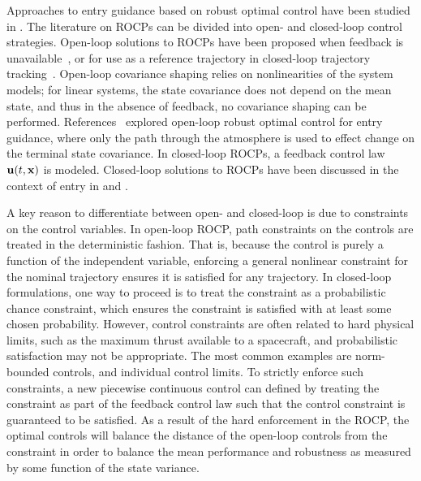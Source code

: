 Approaches to entry guidance based on robust optimal control have been studied in \cite{AltitudeUnderUncertainty, EntryOUUThesis1, EntryOUUThesis2, MarsEntryDesensitized, EntryOUU}. 
The literature on ROCPs can be divided into open- and closed-loop control strategies. Open-loop solutions to ROCPs have been proposed when feedback is unavailable~\cite{RossRSOCP}, or for use as a reference trajectory in closed-loop trajectory tracking~\cite{EntryOUUThesis1}. Open-loop covariance shaping relies on nonlinearities of the system models; for linear systems, the state covariance does not depend on the mean state, and thus in the absence of feedback, no covariance shaping can be performed. References~\cite{AltitudeUnderUncertainty,EntryOUUThesis1} explored open-loop robust optimal control for entry guidance, where only the path through the atmosphere is used to effect change on the terminal state covariance. In closed-loop ROCPs, a feedback control law $\mathbf{u}(t,\mathbf{x})$ is modeled. Closed-loop solutions to ROCPs have been discussed in the context of entry in \cite{EntryOUUThesis2} and \cite{MarsEntryDesensitized}. 

A key reason to differentiate between open- and closed-loop is due to constraints on the control variables. 
In open-loop ROCP, path constraints on the controls are treated in the deterministic fashion. That is, because the control is purely a function of the independent variable, enforcing a general nonlinear constraint for the nominal trajectory ensures it is satisfied for any trajectory. 
In closed-loop formulations, one way to proceed is to treat the constraint as a probabilistic chance constraint, which ensures the constraint is satisfied with at least some chosen probability. However, control constraints are often related to hard physical limits, such as the maximum thrust available to a spacecraft, and probabilistic satisfaction may not be appropriate. The most common examples are norm-bounded controls, and individual control limits. To strictly enforce such constraints, a new piecewise continuous control can defined by treating the constraint as part of the feedback control law such that the control constraint is guaranteed to be satisfied. As a result of the hard enforcement in the ROCP, the optimal controls will balance the distance of the open-loop controls from the constraint in order to balance the mean performance and robustness as measured by some function of the state variance.

